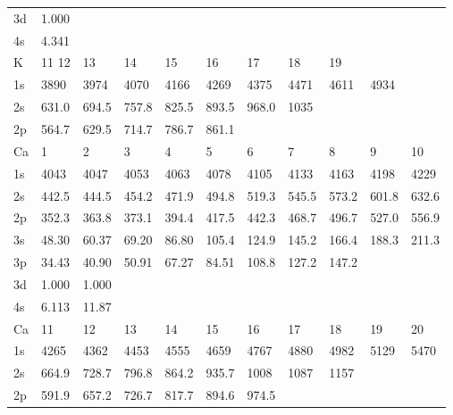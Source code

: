 \begin{table}
\begin{center}
\begin{tabular}{lllllllllll}
3d& 1.000\\
4s& 4.341\\
\hline
K&   11
12&  13&  14&  15&  16&  17&  18&  19\\
\hline
1s&  3890&  3974&  4070&  4166&  4269&  4375&  4471&
4611&  4934\\
2s& 631.0& 694.5& 757.8& 825.5& 893.5& 968.0&  1035\\
2p& 564.7& 629.5& 714.7&
786.7& 861.1\\
\hline
Ca&   1&   2&   3&   4&   5&   6&   7&   8&   9&  10\\
\hline
1s&  4043&  4047&  4053&
4063&  4078&  4105&  4133&  4163&  4198&  4229\\
2s& 442.5& 444.5& 454.2& 471.9& 494.8&
519.3& 545.5& 573.2& 601.8& 632.6\\
2p& 352.3& 363.8& 373.1& 394.4& 417.5& 442.3& 468.7&
496.7& 527.0& 556.9\\
3s& 48.30& 60.37& 69.20& 86.80& 105.4& 124.9& 145.2& 166.4& 188.3&
211.3\\
3p& 34.43& 40.90& 50.91& 67.27& 84.51& 108.8& 127.2& 147.2\\
3d& 1.000& 1.000\\
4s&
6.113& 11.87\\
\hline
Ca&  11&  12&  13&  14&  15&  16&  17&  18&  19&  20\\
\hline
1s&  4265&  4362&  4453&
4555&  4659&  4767&  4880&  4982&  5129&  5470\\
2s& 664.9& 728.7& 796.8& 864.2& 935.7&
1008& 1087& 1157\\
2p& 591.9& 657.2& 726.7& 817.7& 894.6& 974.5\\
\hline
\end{tabular}
\end{center}
\end{table}


